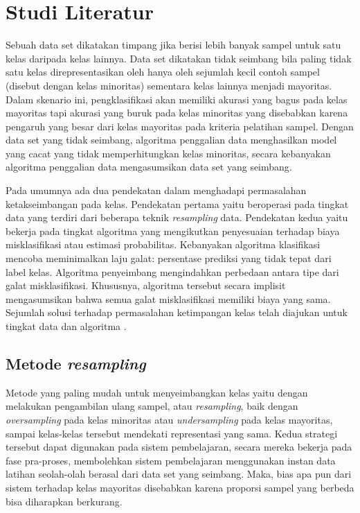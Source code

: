 \documentclass[12pt,a4paper,titlepage]{article}
\begin{document}
\section{Studi Literatur}\label{sec:studi-literatur}

Sebuah data set dikatakan timpang jika berisi lebih banyak sampel untuk satu kelas daripada kelas lainnya.
Data set dikatakan tidak seimbang bila paling tidak satu kelas direpresentasikan oleh hanya oleh sejumlah kecil contoh sampel (disebut dengan kelas minoritas) sementara kelas lainnya menjadi mayoritas.
Dalam skenario ini, pengklasifikasi akan memiliki akurasi yang bagus pada kelas mayoritas tapi akurasi yang buruk pada kelas minoritas yang disebabkan karena pengaruh yang besar dari kelas mayoritas pada kriteria pelatihan sampel. 
Dengan data set yang tidak seimbang, algoritma penggalian data menghasilkan model yang cacat yang tidak memperhitungkan kelas minoritas, secara kebanyakan algoritma penggalian data mengasumsikan data set yang seimbang.

Pada umumnya ada dua pendekatan dalam menghadapi permasalahan ketakseimbangan pada kelas.
Pendekatan pertama yaitu beroperasi pada tingkat data yang terdiri dari beberapa teknik \textit{resampling} data. 
Pendekatan kedua yaitu bekerja pada tingkat algoritma yang mengikutkan penyesuaian terhadap biaya misklasifikasi atau estimasi probabilitas.
Kebanyakan algoritma klasifikasi mencoba meminimalkan laju galat: persentase prediksi yang tidak tepat dari label kelas.
Algoritma penyeimbang mengindahkan perbedaan antara tipe dari galat misklasifikasi.
Khususnya, algoritma tersebut secara implisit mengasumsikan bahwa semua galat misklasifikasi memiliki biaya yang sama.
Sejumlah solusi terhadap permasalahan ketimpangan kelas telah diajukan untuk tingkat data dan algoritma \cite{chawla2004editorial}.

\subsection{Metode \textit{resampling}}\label{subsec:metode-resampling}

Metode yang paling mudah untuk menyeimbangkan kelas yaitu dengan melakukan pengambilan ulang sampel, atau \textit{resampling}, baik dengan \textit{oversampling} pada kelas minoritas atau \textit{undersampling} pada kelas mayoritas, sampai kelas-kelas tersebut mendekati representasi yang sama.
Kedua strategi tersebut dapat digunakan pada sistem pembelajaran, secara mereka bekerja pada fase pra-proses, membolehkan sistem pembelajaran menggunakan instan data latihan seolah-olah berasal dari data set yang seimbang. 
Maka, bias apa pun dari sistem terhadap kelas mayoritas disebabkan karena proporsi sampel yang berbeda bisa diharapkan berkurang.
\end{document}
